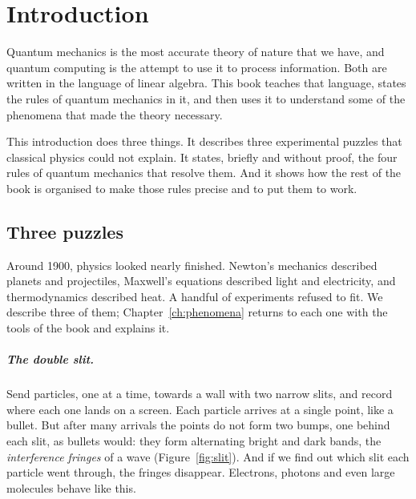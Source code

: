 \chapter*{Introduction}

Quantum mechanics is the most accurate theory of nature that we have, and quantum computing is the attempt to use it to process information. Both are written in the language of linear algebra. This book teaches that language, states the rules of quantum mechanics in it, and then uses it to understand some of the phenomena that made the theory necessary.

This introduction does three things. It describes three experimental puzzles that classical physics could not explain. It states, briefly and without proof, the four rules of quantum mechanics that resolve them. And it shows how the rest of the book is organised to make those rules precise and to put them to work.

\section*{Three puzzles}

Around 1900, physics looked nearly finished. Newton's mechanics described planets and projectiles, Maxwell's equations described light and electricity, and thermodynamics described heat. A handful of experiments refused to fit. We describe three of them; Chapter~\ref{ch:phenomena} returns to each one with the tools of the book and explains it.

\paragraph{The double slit.}
Send particles, one at a time, towards a wall with two narrow slits, and record where each one lands on a screen. Each particle arrives at a single point, like a bullet. But after many arrivals the points do not form two bumps, one behind each slit, as bullets would: they form alternating bright and dark bands, the \emph{interference fringes} of a wave (Figure~\ref{fig:slit}). And if we find out which slit each particle went through, the fringes disappear. Electrons, photons and even large molecules behave like this.

